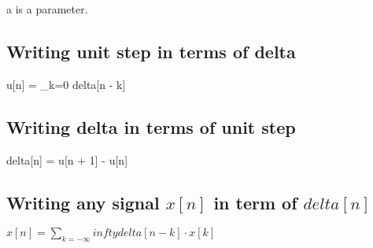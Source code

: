 \documentclass{article}
\begin{document}
a is a parameter.


\subsection{Writing unit step in terms of delta}
u[n] = \sum_{k=0}{\infty} delta[n - k]

\subsection{Writing delta in terms of unit step}
delta[n] = u[n + 1] - u[n]

\subsection{Writing any signal $x[n]$ in term of $delta[n]$}
$x[n] = \sum_{k=-\infty}{infty} delta[n - k] \cdot x[k]$
\end{document}
